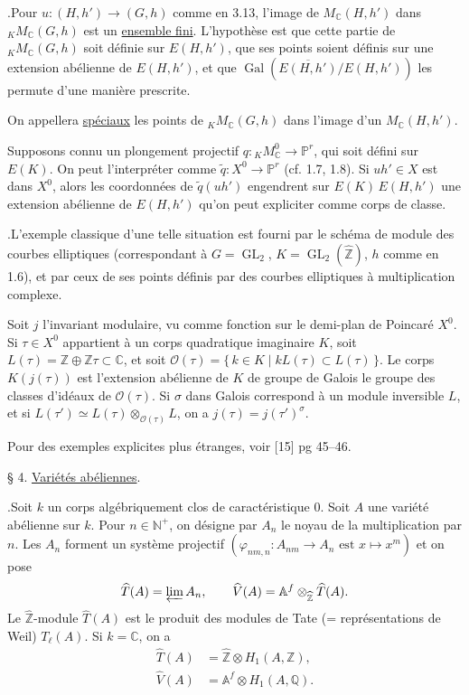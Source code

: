 \documentclass[10pt]{article}
\newcommand{\Af}{\mathbb A^f}
\newcommand{\C}{\mathbb C}
\newcommand{\Q}{\mathbb Q}
\newcommand{\Z}{\mathbb Z}
\newcommand{\GL}{\operatorname{GL}}
\newcommand{\Gal}{\operatorname{Gal}}
\begin{document}
.\quad Pour $u:(H,h')\longrightarrow(G,h)$ comme en 3.13, l'image de $M_{\C}(H,h')$ dans ${}_K M_{\C}(G,h)$ est un \uline{ensemble fini}. L'hypothèse est que cette partie de ${}_K M_{\C}(G,h)$ soit définie sur $E(H,h')$, que ses points soient définis sur une extension abélienne de $E(H,h')$, et que $\Gal(\overline{E(H,h')}/E(H,h'))$ les permute d'une manière prescrite.

On appellera \textquotedbl{}\uline{spéciaux}\textquotedbl{} les points de ${}_K M_{\C}(G,h)$ dans l'image d'un $M_{\C}(H,h')$.

Supposons connu un plongement projectif $q:{}_K M_{\C}^{0}\longrightarrow \mathbb P^r$, qui soit défini sur $E(K)$. On peut l'interpréter comme $\widetilde q:X^0\longrightarrow \mathbb P^r$ (cf. 1.7, 1.8). Si $uh'\in X$ est dans $X^0$, alors les coordonnées de $\widetilde q(uh')$ engendrent sur $E(K)\,E(H,h')$ une extension abélienne de $E(H,h')$ qu'on peut expliciter comme corps de classe.

.\quad L'exemple classique d'une telle situation est fourni par le schéma de module des courbes elliptiques (correspondant à $G=\GL_2$, $K=\GL_2(\widehat{\Z})$, $h$ comme en 1.6), et par ceux de ses points définis par des courbes elliptiques à multiplication complexe.

Soit $j$ l'invariant modulaire, vu comme fonction sur le demi-plan de Poincaré $X^0$. Si $\tau\in X^0$ appartient à un corps quadratique imaginaire $K$, soit $L(\tau)=\Z\oplus \Z\tau\subset\C$, et soit $\mathcal O(\tau)=\{\,k\in K\mid kL(\tau)\subset L(\tau)\,\}$. Le corps $K(j(\tau))$ est l'extension abélienne de $K$ de groupe de Galois le groupe des classes d'idéaux de $\mathcal O(\tau)$. Si $\sigma$ dans Galois correspond à un module inversible $L$, et si $L(\tau')\simeq L(\tau)\otimes_{\mathcal O(\tau)}L$, on a $j(\tau)=j(\tau')^\sigma$.

Pour des exemples explicites plus étranges, voir [15] pg 45--46.


\par\vspace{1.1em}
\noindent § 4. \uline{Variétés abéliennes}.\par\vspace{0.9em}

.\quad Soit $k$ un corps algébriquement clos de caractéristique $0$. Soit $A$ une variété abélienne sur $k$. Pour $n\in\mathbb N^+$, on désigne par $A_n$ le noyau de la multiplication par $n$. Les $A_n$ forment un système projectif $(\varphi_{nm,n}:A_{nm}\longrightarrow A_n\text{ est }x\longmapsto x^m)$
et on pose
\[
\widehat T(A)=\varprojlim A_n,\qquad
\widehat V(A)=\Af\otimes_{\widehat{\Z}}\widehat T(A).
\]
Le $\widehat{\Z}$-module $\widehat T(A)$ est le produit des modules de Tate (= représentations de Weil) $T_\ell(A)$. Si $k=\C$, on a
\begingroup
\makeatletter
\tagsleft@true
\makeatother
\begin{align}
\widehat T(A)&=\widehat{\Z}\otimes H_1(A,\Z),\tag{4.1.1}\\
\widehat V(A)&=\Af\otimes H_1(A,\Q).\tag{4.1.2}
\end{align}
\endgroup
\end{document}

